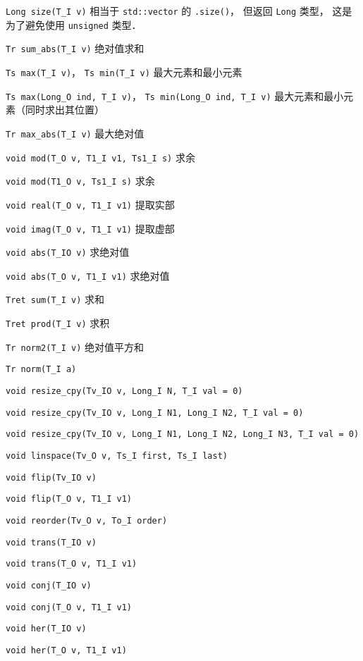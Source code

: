 
\begin{issues}
\issueDraft
\end{issues}

\verb|Long size(T_I v)| 相当于 \verb|std::vector| 的 \verb|.size()|， 但返回 \verb|Long| 类型， 这是为了避免使用 \verb|unsigned| 类型．

\verb|Tr sum_abs(T_I v)| 绝对值求和

\verb|Ts max(T_I v)|， \verb|Ts min(T_I v)| 最大元素和最小元素

\verb|Ts max(Long_O ind, T_I v)|， \verb|Ts min(Long_O ind, T_I v)| 最大元素和最小元素（同时求出其位置）

\verb|Tr max_abs(T_I v)| 最大绝对值

\verb|void mod(T_O v, T1_I v1, Ts1_I s)| 求余

\verb|void mod(T1_O v, Ts1_I s)| 求余

\verb|void real(T_O v, T1_I v1)| 提取实部

\verb|void imag(T_O v, T1_I v1)| 提取虚部

\verb|void abs(T_IO v)| 求绝对值

\verb|void abs(T_O v, T1_I v1)| 求绝对值

\verb|Tret sum(T_I v)| 求和

\verb|Tret prod(T_I v)| 求积

\verb|Tr norm2(T_I v)| 绝对值平方和

\verb|Tr norm(T_I a)|

\verb|void resize_cpy(Tv_IO v, Long_I N, T_I val = 0)|

\verb|void resize_cpy(Tv_IO v, Long_I N1, Long_I N2, T_I val = 0)|

\verb|void resize_cpy(Tv_IO v, Long_I N1, Long_I N2, Long_I N3, T_I val = 0)|

\verb|void linspace(Tv_O v, Ts_I first, Ts_I last)|

\verb|void flip(Tv_IO v)|

\verb|void flip(T_O v, T1_I v1)|

\verb|void reorder(Tv_O v, To_I order)|

\verb|void trans(T_IO v)|

\verb|void trans(T_O v, T1_I v1)|

\verb|void conj(T_IO v)|

\verb|void conj(T_O v, T1_I v1)|

\verb|void her(T_IO v)|

\verb|void her(T_O v, T1_I v1)|

